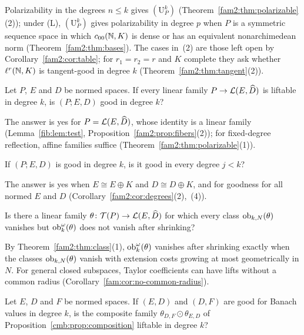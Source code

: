Polarizability in the degrees $n\le k$ gives $(\mathrm U^k_P)$ (Theorem~\ref{fam2:thm:polarizable}(2)); under
\textup{(L)}, $(\mathrm U^k_P)$ gives polarizability in degree $p$ when $P$ is a symmetric sequence space in which
$c_{00}(\mathbb N,K)$ is dense or has an equivalent nonarchimedean norm (Theorem~\ref{fam2:thm:bases}). The cases in~(2) are those left open by
Corollary~\ref{fam2:cor:table}; for $r_1=r_2=r$ and $K$ complete they ask whether $\ell^r(\mathbb N,K)$ is tangent-good in
degree $k$ (Theorem~\ref{fam2:thm:tangent}(2)).

\begin{question}\label{q:quest:linear-families}
Let $P$, $E$ and $D$ be normed spaces. If every linear family $P\to\mathcal L(E,\widehat D)$ is liftable in degree $k$, is
$(P;E,D)$ good in degree $k$?
\end{question}

The answer is yes for $P=\mathcal L(E,\widehat D)$, whose identity is a linear family (Lemma~\ref{fib:lem:test},
Proposition~\ref{fam2:prop:fibers}(2)); for fixed-degree reflection, affine families suffice
(Theorem~\ref{fam2:thm:polarizable}(1)).

\begin{question}\label{q:quest:lower-degrees}
If $(P;E,D)$ is good in degree $k$, is it good in every degree $j<k$?
\end{question}

The answer is yes when $E\cong E\oplus K$ and $D\cong D\oplus K$, and for goodness for all normed $E$ and $D$
(Corollary~\ref{fam2:cor:degrees}(2),~(4)).

\begin{question}\label{q:quest:non-uniform}
Is there a linear family $\theta\colon\mathcal T(P)\to\mathcal L(E,\widehat D)$ for which every class $\operatorname{ob}_{k,N}(\theta)$ vanishes
but $\operatorname{ob}^\omega_k(\theta)$ does not vanish after shrinking?
\end{question}

By Theorem~\ref{fam2:thm:class}(1), $\operatorname{ob}^\omega_k(\theta)$ vanishes after shrinking exactly when the classes
$\operatorname{ob}_{k,N}(\theta)$ vanish with extension costs growing at most geometrically in $N$. For general closed subspaces, Taylor
coefficients can have lifts without a common radius (Corollary~\ref{fam:cor:no-common-radius}).

\begin{question}\label{q:quest:composite}
Let $E$, $D$ and $F$ be normed spaces. If $(E,D)$ and $(D,F)$ are good for Banach values in degree $k$, is the
composite family $\theta_{D,F}\odot\theta_{E,D}$ of Proposition~\ref{cmb:prop:composition} liftable in degree $k$?
\end{question}

